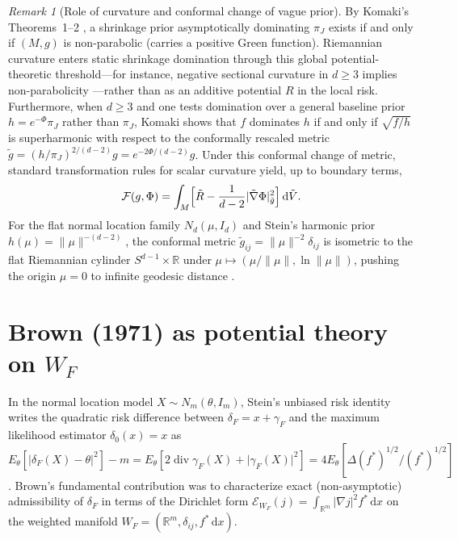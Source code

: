 \documentclass[a4paper,11pt,noarxiv]{quantumarticle}
\newcommand{\R}{\mathbb{R}}
\newcommand{\norm}[1]{\lVert #1\rVert}
\newcommand{\abs}[1]{\lvert #1\rvert}
\newcommand{\dd}{\,\mathrm{d}}
\newcommand{\grad}{\nabla}
\theoremstyle{plain}
\theoremstyle{definition}
\theoremstyle{remark}
\newtheorem{remark}[theorem]{Remark}
\begin{document}
\begin{remark}[Role of curvature and conformal change of vague prior]
\label{rem:conformal}
By Komaki's Theorems~1--2 \cite{komaki2006}, a shrinkage prior
asymptotically dominating $\pi_J$ exists if and only if $(M,g)$ is
non-parabolic (carries a positive Green function). Riemannian curvature
enters static shrinkage domination through this global potential-theoretic
threshold---for instance, negative sectional curvature in $d\ge3$ implies
non-parabolicity \cite[Theorem~3]{komaki2006}---rather than as an
additive potential $R$ in the local risk. Furthermore, when $d\ge3$ and
one tests domination over a general baseline prior $h=e^{-\Phi}\pi_J$
rather than $\pi_J$, Komaki \cite[\S3, Theorems 4--6]{komaki2006} shows
that $f$ dominates $h$ if and only if $\sqrt{f/h}$ is superharmonic
with respect to the conformally rescaled metric
$\tilde g=(h/\pi_J)^{2/(d-2)}g=e^{-2\Phi/(d-2)}g$. Under this conformal
change of metric, standard transformation rules for scalar curvature
yield, up to boundary terms,
\begin{equation}\label{eq:conformal_F}
\mathcal F(g,\Phi)=\int_M\Bigl[\tilde R-\frac{1}{d-2}
\abs{\tilde\grad\Phi}_{\tilde g}^2\Bigr]\dd\tilde V.
\end{equation}
For the flat normal location family $N_d(\mu,I_d)$ and Stein's harmonic
prior $h(\mu)=\norm{\mu}^{-(d-2)}$, the conformal metric $\tilde g_{ij}
=\norm{\mu}^{-2}\delta_{ij}$ is isometric to the flat Riemannian
cylinder $S^{d-1}\times\R$ under $\mu\mapsto(\mu/\norm{\mu},\ln\norm{\mu})$,
pushing the origin $\mu=0$ to infinite geodesic distance
\cite[Example~1]{komaki2006}.
\end{remark}

\section{Brown (1971) as potential theory on \texorpdfstring{$W_F$}{W\_F}}
\label{sec:brown}

In the normal location model $X\sim N_m(\theta,I_m)$, Stein's unbiased
risk identity writes the quadratic risk difference between $\delta_F=x+\gamma_F$
and the maximum likelihood estimator $\delta_0(x)=x$ as
$E_\theta[\abs{\delta_F(X)-\theta}^2]-m=E_\theta[2\operatorname{div}\gamma_F(X)+\abs{\gamma_F(X)}^2]
=4E_\theta[\Delta(f^*)^{1/2}/(f^*)^{1/2}]$. Brown's fundamental
contribution \cite{brown1971} was to characterize exact (non-asymptotic)
admissibility of $\delta_F$ in terms of the Dirichlet form
$\mathcal E_{W_F}(j)=\int_{\R^m}\abs{\grad j}^2f^*\dd x$ on the weighted
manifold $W_F=(\R^m,\delta_{ij},f^*\dd x)$.
\end{document}
